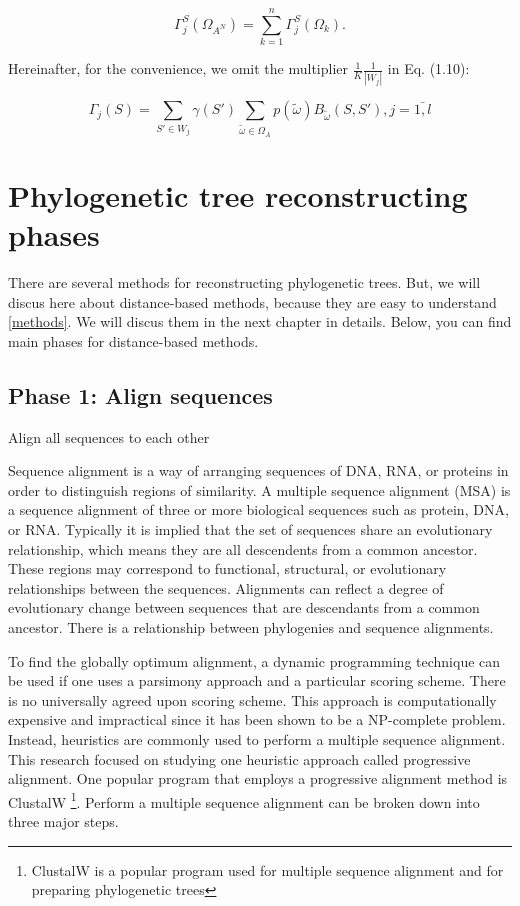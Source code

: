 \begin{equation*}
\Gamma_j^S(\Omega_{A^N}) = \sum_{k=1}^n \Gamma_j^S(\Omega_k). 
\end{equation*}

Hereinafter, for the convenience, we omit the multiplier 
$\frac{1}{K}\frac{1}{|W_j|}$ in Eq. (1.10):

\begin{equation}
\Gamma_j(S) = \sum_{S' \in W_j} \gamma(S') \sum_{\tilde{\omega} \in \Omega_A} p(\tilde{\omega}) B_{\tilde{\omega}}(S,S'), j = \bar{1,l}
\end{equation}

\section{Phylogenetic tree reconstructing phases}
There are several methods for reconstructing phylogenetic trees.
But, we will discus here about distance-based methods, 
because they are easy to understand \ref{methods}.
We will discus them in the next chapter in details. 
Below, you can find main phases for distance-based methods.

\subsection{Phase 1: Align sequences} \label{phase1}

\begin{algorithm}[H]
{
	Align all sequences to each other\;
}
\end{algorithm}

\cite{rporter}
Sequence alignment is a way of arranging sequences of DNA, RNA, or 
proteins in order to distinguish regions of similarity. A multiple sequence 
alignment (MSA) is a sequence alignment of three or more biological sequences 
such as protein, DNA, or RNA. Typically it is implied that the set of sequences 
share an evolutionary relationship, which means they are all descendents from a 
common ancestor. These regions may correspond to functional, structural, or 
evolutionary relationships between the sequences. Alignments can reflect a degree 
of evolutionary change between sequences that are descendants from a common 
ancestor. There is a relationship between phylogenies and sequence alignments.

To find the globally optimum alignment, a dynamic programming technique 
can be used if one uses a parsimony approach and a particular scoring scheme. 
There is no universally agreed upon scoring scheme. This approach is 
computationally expensive and impractical since it has been shown to be a NP-complete 
problem. Instead, heuristics are commonly used to perform a multiple 
sequence alignment. This research focused on studying one heuristic approach 
called progressive alignment. One popular program that employs a progressive 
alignment method is ClustalW \nocite{clustalw} \footnote{ClustalW is a popular 
program used for multiple sequence alignment and for preparing phylogenetic trees}. 
Perform a multiple sequence alignment can be broken down into three major steps.
\nocite{clustalwsite}

